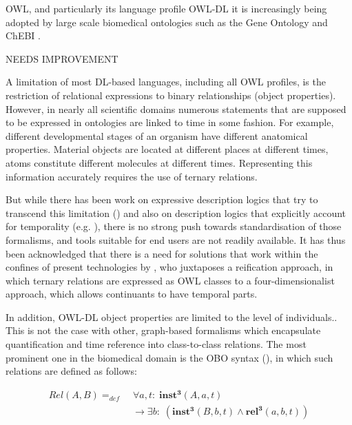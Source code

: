 \documentclass[10pt]{bmc_article}
\newcommand{\mirel}[1]{\ensuremath{\mathrm{\mathbf{#1}}}}
\newcommand{\mclass}[1]{\ensuremath{\mathit{#1}}}
\newcommand{\mrel}[2]{\mirel{#1^#2}}
\newcommand{\mrelt}[1]{\mrel{#1}{3}}
\newenvironment{bmcformat}{\baselineskip20pt\sloppy\setboolean{publ}{false}}{\baselineskip20pt\sloppy}
\begin{document}
\begin{bmcformat}
OWL, and particularly its language profile OWL-DL it is increasingly being adopted by large scale biomedical
ontologies such as the Gene Ontology \cite{go2000} and ChEBI \cite{chebinar2013}. 

NEEDS IMPROVEMENT

A limitation of most DL-based languages, including all OWL profiles, is the restriction of relational
expressions to binary relationships (object properties). However, in 
nearly all scientific domains
numerous statements that are supposed to be expressed 
in ontologies are linked to time in some fashion. 
For example, different developmental stages of an organism have different anatomical properties. 
Material objects are located at different places at different times, 
atoms constitute different molecules at different times. 
Representing this information accurately requires the use of ternary relations.  

%

But while there has been work on expressive description
logics that try to transcend this limitation (\cite{Calvanese:1997}) and also on description logics
that explicitly account for temporality (e.g. \cite{Wolter:2001}), there is no strong push
towards standardisation of those formalisms, and tools suitable for end users
are not readily available. It has thus been acknowledged that there is a need
for solutions that work within the confines of present technologies
by \cite{Welty:2006}, who juxtaposes a reification approach, in which ternary relations are 
expressed as OWL classes to a four-dimensionalist approach, which allows continuants to have 
temporal parts.

In addition, OWL-DL object properties are limited to the level of individuals..
This is not the case with other, graph-based formalisms 
which encapsulate quantification
and time reference into class-to-class relations. The most prominent one in the biomedical domain is 
the OBO syntax (\cite{OBO:RO}), in which such relations are defined as follows:

\begin{equation}
\begin{split}
\mclass{Rel}(\mclass{A},\mclass{B}) =_{def}&\;
\forall a, t:\; \mrelt{inst}(\mclass{A}, a, t) \\
&\ \rightarrow
\exists b:\;(\mrelt{inst}(\mclass{B},b,t) \wedge
\mrelt{rel}(a,b,t))
\end{split}
\label{eq:obo}
\end{equation}
 

\end{bmcformat}
\end{document}
